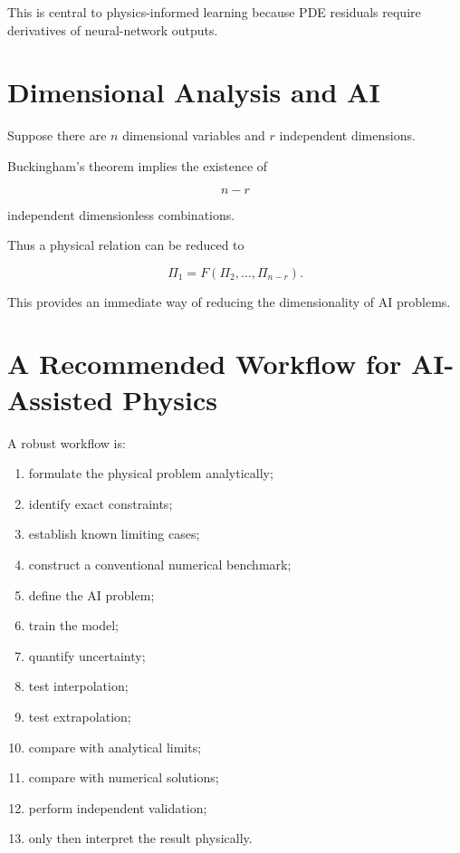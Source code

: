 \documentclass[11pt,a4paper,oneside]{book}
\begin{document}
This is central to physics-informed learning because PDE residuals require
derivatives of neural-network outputs.

\chapter{Dimensional Analysis and AI}

Suppose there are $n$ dimensional variables and $r$ independent dimensions.

Buckingham's theorem implies the existence of

\begin{equation}
n-r
\end{equation}

independent dimensionless combinations.

Thus a physical relation can be reduced to

\begin{equation}
\Pi_1
=
F(\Pi_2,\ldots,\Pi_{n-r}).
\end{equation}

This provides an immediate way of reducing the dimensionality of AI problems.

\chapter{A Recommended Workflow for AI-Assisted Physics}

A robust workflow is:

\begin{enumerate}
\item formulate the physical problem analytically;
\item identify exact constraints;
\item establish known limiting cases;
\item construct a conventional numerical benchmark;
\item define the AI problem;
\item train the model;
\item quantify uncertainty;
\item test interpolation;
\item test extrapolation;
\item compare with analytical limits;
\item compare with numerical solutions;
\item perform independent validation;
\item only then interpret the result physically.
\end{enumerate}
\end{document}
